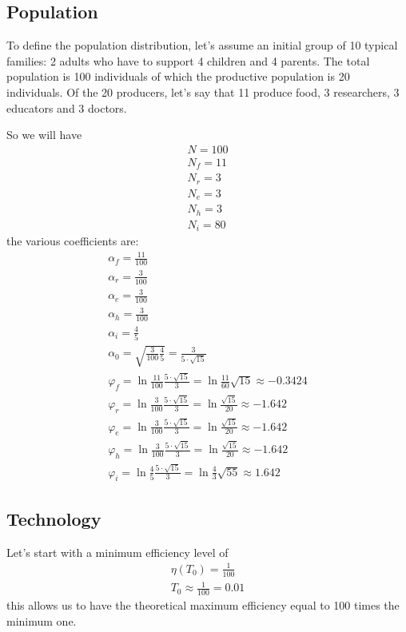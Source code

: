 \documentclass[a4paper,twoside]{article}
\begin{document}
\subsection{Population}

To define the population distribution, let's assume an initial group of 10 typical families: 2 adults who have to support 4 children and 4 parents.
The total population is 100 individuals of which the productive population is 20 individuals.
Of the 20 producers, let's say that 11 produce food, 3 researchers, 3 educators and 3 doctors.

So we will have
\begin{align*}
	N = 100
	\\
	N_f = 11
	\\
	N_r = 3
	\\
	N_e = 3
	\\
	N_h = 3
	\\
	N_i = 80
\end{align*}
the various coefficients are:
\begin{align*}
	\alpha_f = \frac{11}{100}
	\\
	\alpha_r = \frac{3}{100}
	\\
	\alpha_e = \frac{3}{100}
	\\
	\alpha_h = \frac{3}{100}
	\\
	\alpha_i = \frac{4}{5}
	\\
	\alpha_0 = \sqrt{\frac{3}{100} \frac{4}{5}} = \frac{3}{5 \cdot \sqrt{15}}
	\\
	\varphi_f = \ln \frac{11}{100} \frac{5 \cdot \sqrt{15}}{3}
	= \ln \frac{11}{60} \sqrt{15}
	\approx -0.3424
	\\
	\varphi_r = \ln \frac{3}{100} \frac{5 \cdot \sqrt{15}}{3}
	= \ln \frac{\sqrt{15}}{20}
	\approx -1.642
	\\
	\varphi_e = \ln \frac{3}{100} \frac{5 \cdot \sqrt{15}}{3}
	= \ln \frac{\sqrt{15}}{20}
	\approx -1.642
	\\
	\varphi_h = \ln \frac{3}{100} \frac{5 \cdot \sqrt{15}}{3}
	= \ln \frac{\sqrt{15}}{20}
	\approx -1.642
	\\
	\varphi_i = \ln \frac{4}{5} \frac{5 \cdot \sqrt{15}}{3}
	= \ln \frac{4}{3} \sqrt{55}
	\approx 1.642
\end{align*}

\subsection{Technology}

Let's start with a minimum efficiency level of
\begin{align*}
	\eta(T_0) = \frac{1}{100}
	\\
	T_0 \approx \frac{1}{100} = 0.01
\end{align*}
this allows us to have the theoretical maximum efficiency equal to 100 times the minimum one.
\end{document}
